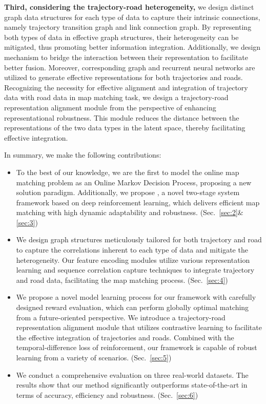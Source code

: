 \textbf{Third, considering the trajectory-road heterogeneity,} we design distinct graph data structures for each type of data to capture their intrinsic connections, namely trajectory transition graph and link connection graph. By representing both types of data in effective graph structures, their heterogeneity can be mitigated, thus promoting better information integration. Additionally, we design mechanism to bridge the interaction between their representation to facilitate better fusion. Moreover, corresponding graph and recurrent neural networks are utilized to generate effective representations for both trajectories and roads. Recognizing the necessity for effective alignment and integration of trajectory data with road data in map matching task, we design a trajectory-road representation alignment module from the perspective of enhancing representational robustness. This module reduces the distance between the representations of the two data types in the latent space, thereby facilitating effective integration.

In summary, we make the following contributions:
\vspace{-\topsep}
\begin{itemize}[leftmargin=10.2pt]
\setlength{\itemsep}{0pt}
\setlength{\parsep}{0pt}
\setlength{\parskip}{0pt}
\item To the best of our knowledge, we are the first to model the online map matching problem as an Online Markov Decision Process, proposing a new solution paradigm. Additionally, we propose \textbf{\modelName}, a novel two-stage system framework based on deep reinforcement learning, which delivers efficient map matching with high dynamic adaptability and robustness. (Sec.~\ref{sec:2}\&\ref{sec:3})
\item We design graph structures meticulously tailored for both trajectory and road to capture the correlations inherent to each type of data and mitigate the heterogeneity. Our feature encoding modules utilize various representation learning and sequence correlation capture techniques to integrate trajectory and road data, facilitating the map matching process. (Sec.~\ref{sec:4})
\item We propose a novel model learning process for our \textbf{\modelName} framework with carefully designed reward evaluation, which can perform globally optimal matching from a future-oriented perspective. We introduce a trajectory-road representation alignment module that utilizes contrastive learning to facilitate the effective integration of trajectories and roads. Combined with the temporal-difference loss of reinforcement, our framework is capable of robust learning from a variety of scenarios. (Sec.~\ref{sec:5})
\item We conduct a comprehensive evaluation on three real-world datasets. The results show that our method significantly outperforms state-of-the-art in terms of accuracy, efficiency and robustness. (Sec.~\ref{sec:6})
\end{itemize}